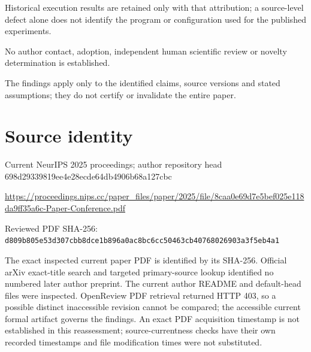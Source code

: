 \documentclass[11pt]{article}
\begin{document}
Historical execution results are retained only with that attribution; a source-level defect alone does not identify the program or configuration used for the published experiments.\par

No author contact, adoption, independent human scientific review or novelty determination is established.\par

The findings apply only to the identified claims, source versions and stated assumptions; they do not certify or invalidate the entire paper.\par

\section*{Source identity}

Current NeurIPS 2025 proceedings; author repository head 698d29339819ee4e28ecde64db4906b68a127cbc

\url{https://proceedings.nips.cc/paper_files/paper/2025/file/8caa0e69d7e5bef025e118da9ff35a6c-Paper-Conference.pdf}

Reviewed PDF SHA-256: \nolinkurl{d809b805e53d307cbb8dce1b896a0ac8bc6cc50463cb40768026903a3f5eb4a1}

The exact inspected current paper PDF is identified by its SHA-256. Official arXiv exact-title search and targeted primary-source lookup identified no numbered later author preprint. The current author README and default-head files were inspected. OpenReview PDF retrieval returned HTTP 403, so a possible distinct inaccessible revision cannot be compared; the accessible current formal artifact governs the findings. An exact PDF acquisition timestamp is not established in this reassessment; source-currentness checks have their own recorded timestamps and file modification times were not substituted.
\end{document}
